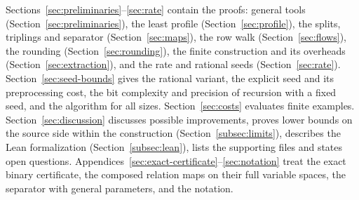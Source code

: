 Sections~\ref{sec:preliminaries}--\ref{sec:rate} contain the proofs:
general tools
(Section~\ref{sec:preliminaries}), the least profile
(Section~\ref{sec:profile}), the splits, triplings and separator
(Section~\ref{sec:maps}), the row walk (Section~\ref{sec:flows}), the
rounding (Section~\ref{sec:rounding}), the finite construction and its
overheads (Section~\ref{sec:extraction}), and the rate and rational seeds
(Section~\ref{sec:rate}). Section~\ref{sec:seed-bounds} gives the
rational variant, the explicit seed and its preprocessing cost, the bit
complexity and precision of recursion with a fixed seed, and the
algorithm for all sizes. Section~\ref{sec:costs} evaluates finite
examples. Section~\ref{sec:discussion} discusses possible improvements,
proves lower bounds on the source side within the construction
(Section~\ref{subsec:limits}), describes the Lean formalization
(Section~\ref{subsec:lean}), lists the supporting files and states open
questions.
Appendices~\ref{sec:exact-certificate}--\ref{sec:notation} treat the exact binary certificate, the composed relation maps on their
full variable spaces, the separator with general parameters, and the
notation.
